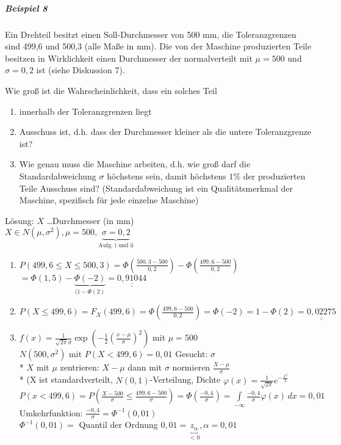 \documentclass[a4paper]{scrartcl}
\begin{document}
\begin{enumerate}
\begin{enumerate}
\begin{itemize}
         \subparagraph{Beispiel 8} Ein Drehteil besitzt einen Soll-Durchmesser von 500 mm, die Toleranzgrenzen sind 499,6 und 500,3 (alle Maße in mm). Die von der Maschine produzierten Teile besitzen in Wirklichkeit einen Durchmesser der normalverteilt mit $\mu = 500$ und $\sigma = 0,2$ ist (siehe Diskussion 7).
         
         Wie groß ist die Wahrscheinlichkeit, dass ein solches Teil
            \begin{enumerate}
            \item innerhalb der Toleranzgrenzen liegt
            \item Ausschuss ist, d.h. dass der Durchmesser kleiner als die untere Toleranzgrenze ist?
            \item Wie genau muss die Maschine arbeiten, d.h. wie groß darf die Standardabweichung $\sigma$ höchstens sein, damit höchstens $1\%$ der produzierten Teile Ausschuss sind? (Standardabweichung ist ein Qualitätsmerkmal der Maschine, spezifisch für jede einzelne Maschine)
            \end{enumerate}
            
            Lösung: $X$ \dots Durchmesser (in mm)\\
            $X \in N (\mu,\sigma^2), \mu = 500, \underbrace{\sigma = 0,2}_{\text{Aufg. i und ii}}$
            \begin{enumerate}
            \item $P(499,6 \leq X \leq 500,3) = \Phi (\frac{500,3 - 500}{0,2} ) - \Phi (\frac{499,6 - 500}{0,2} ) $\\
            $= \Phi (1,5) - \underbrace{\Phi(-2)}_{(1-\Phi(2)} = \underline{\underline{0,91044}}$
            \item $P(X \leq 499,6 ) = F_X (499,6) = \Phi ( \frac{499,6-500}{0,2}) = \Phi (-2) = 1 - \Phi(2)= \underline{\underline{0,02275}}$
            \item             $f(x) = \frac{1}{\sqrt{2\pi} \sigma} \exp{(-\frac{1}{2} (\frac{x-\mu}{\sigma})^2 )}$ mit $\mu = 500$\\
            $N(500,\sigma^2 ) \text{ mit } P(X <499,6 ) = 0,01$ Gesucht: $\sigma$\\*
            $X$ mit $\mu$ zentrieren: $X-\mu$ dann mit $\sigma$ normieren $\frac{X-\mu}{\sigma} $\\*
            (X ist standardverteilt, $N(0,1)$-Verteilung, Dichte $\varphi(x) = \frac{1}{\sqrt{2\pi}} e^{-\frac{x^2}{2}}$
            $P(x < 499,6) = P(\frac{X-500}{\sigma} \leq \frac{499,6 - 500}{\sigma}) = \Phi (\frac{-0,4}{\sigma}) = \int\limits_{-\infty}{\frac{-0,4}{\sigma}} \varphi (x) \, dx = 0,01$\\
            Umkehrfunktion: $\frac{-0,4}{\sigma} = \Phi^{-1} (0,01)$\\
            $\Phi^{-1} (0,01) = $ Quantil der Ordnung $0,01 = \underbrace{z_\alpha}_{<0}, \alpha = 0,01$
            \end{enumerate}
        \end{itemize}
        

\end{enumerate}
\end{enumerate}
\end{document}

